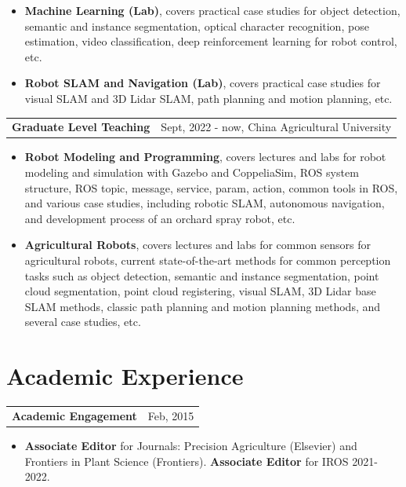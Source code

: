 \documentclass[margin,line]{res}
\begin{document}
\begin{resume}
\begin{itemize}
\item[] \textbf{Machine Learning (Lab)}, covers practical case studies for object detection, semantic and instance segmentation, optical character recognition, pose estimation, video classification, deep reinforcement learning for robot control, etc.

\item[] \textbf{Robot SLAM and Navigation (Lab)}, covers practical case studies for visual SLAM and 3D Lidar SLAM, path planning and motion planning, etc.
\end{itemize}

\begin{tabularx}{\textwidth}{X r}
{\bf Graduate Level Teaching} & Sept, 2022 - now, China Agricultural University\\
\end{tabularx}
\begin{itemize}
\item[] \textbf{Robot Modeling and Programming}, covers lectures and labs for robot modeling and simulation with Gazebo and CoppeliaSim, ROS system structure, ROS topic, message, service, param, action, common tools in ROS, and various case studies, including robotic SLAM, autonomous navigation, and development process of an orchard spray robot, etc.

\item[] \textbf{Agricultural Robots}, covers lectures and labs for common sensors for agricultural robots, current state-of-the-art methods for common perception tasks such as object detection, semantic and instance segmentation, point cloud segmentation, point cloud registering, visual SLAM, 3D Lidar base SLAM methods, classic path planning and motion planning methods, and several case studies, etc.
\end{itemize}

\section{\sc Academic Experience}
\begin{tabularx}{\textwidth}{X r}
{\bf Academic Engagement} & Feb, 2015\\
\end{tabularx}
\begin{itemize}
\item[] \textbf{Associate Editor} for Journals: Precision Agriculture (Elsevier) and Frontiers in Plant Science (Frontiers). \textbf{Associate Editor} for IROS 2021-2022.
\end{itemize}


\end{resume}
\end{document}
